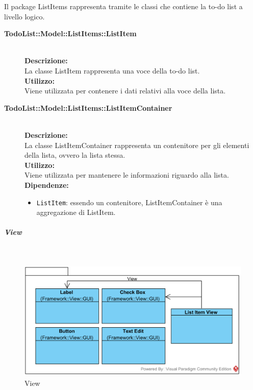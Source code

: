 Il package ListItems rappresenta tramite le classi che contiene la to-do list a livello logico.\\
\begin{description}
	\item[\textbf{TodoList\-::Model\-::ListItems::ListItem}] \hfill\\
	\textbf{Descrizione:}\\
	La classe ListItem rappresenta una voce della to-do list.\\
	\textbf{Utilizzo:}\\
	Viene utilizzata per contenere i dati relativi alla voce della lista.
	\item[\textbf{TodoList\-::Model\-::ListItems::ListItemContainer}] \hfill\\
	\textbf{Descrizione:}\\
	La classe ListItemContainer rappresenta un contenitore per gli elementi della lista, ovvero la lista stessa.\\
	\textbf{Utilizzo:}\\
	Viene utilizzata per mantenere le informazioni riguardo alla lista.\\
	\textbf{Dipendenze:}
	\begin{itemize}
		\item \texttt{ListItem}: essendo un contenitore, ListItemContainer è una aggregazione di ListItem.
	\end{itemize}
\end{description}


\subparagraph{View}\mbox{}\\
\nopagebreak
\begin{figure}[H]
	\centering
	\includegraphics[width=14cm]{../../documenti/SpecificaTecnica/diagrammi_img/classi_e_package/todo_view.png}
	\caption{View}
\end{figure}

